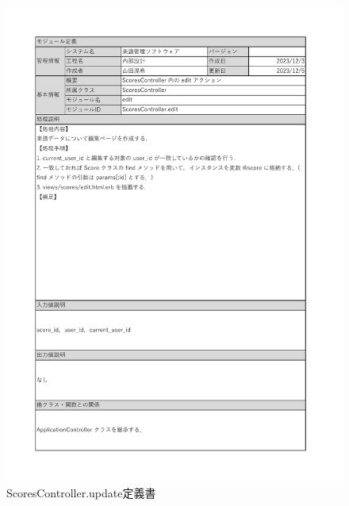 \begin{figure}[h]
    \centering
    \includegraphics[scale=0.7]{img/Scores/xlsx/ScoresController_edit.pdf}
    \vspace{-1cm}
    \caption{ScoresController.update定義書}
\end{figure}

